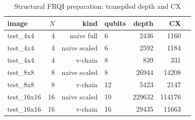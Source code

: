 
\begin{table}[htbp]
\centering
\caption{Structural FRQI preparation: transpiled depth and CX}
\label{tab:structural_resources}
\small
\begin{tabular}{lrrlrrr}
\toprule
image & $N$ & kind & qubits & depth & CX \\
\midrule
test\_4x4 & 4 & naive full & 6 & 2436 & 1160 \\
test\_4x4 & 4 & naive scaled & 6 & 2592 & 1184 \\
test\_4x4 & 4 & v-chain & 8 & 839 & 331 \\
test\_8x8 & 8 & naive scaled & 8 & 26944 & 14208 \\
test\_8x8 & 8 & v-chain & 12 & 5423 & 2147 \\
test\_16x16 & 16 & naive scaled & 10 & 229632 & 114176 \\
test\_16x16 & 16 & v-chain & 16 & 29435 & 11663 \\
\bottomrule
\end{tabular}
\end{table}
